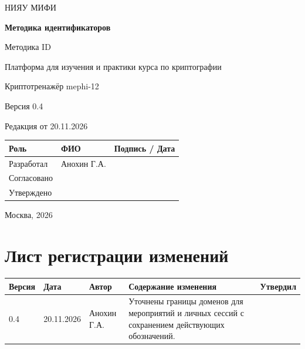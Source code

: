 \documentclass[12pt,a4paper]{article}
\begin{document}
\hypersetup{pageanchor=false}
\begin{titlepage}
  \thispagestyle{empty}
  \centering
  {\large НИЯУ МИФИ\par}
  \vspace*{3.5cm}
  {\LARGE\bfseries Методика идентификаторов\par}
  \vspace{0.5cm}
  {\large Методика ID\par}
  \vspace{0.6cm}
  {\large Платформа для изучения и практики курса по криптографии\par}
  {\large Криптотренажёр mephi-12\par}
  \vspace{0.7cm}
  {\large Версия 0.4\par}
  {\large Редакция от 20.11.2026\par}
  \vspace{1cm}
  \begin{tabularx}{\textwidth}{@{}p{3.4cm}Xp{4cm}@{}}
    \toprule
    Роль & ФИО & Подпись / Дата \\
    \midrule
    Разработал & Анохин Г.А. & \\
    \addlinespace[6pt]
    Согласовано & & \\
    \addlinespace[6pt]
    Утверждено & & \\
    \bottomrule
  \end{tabularx}
  \vfill
  {\large Москва, 2026\par}
\end{titlepage}
\hypersetup{pageanchor=true}

\section*{Лист регистрации изменений}
\begingroup\small\singlespacing
\noindent
\begin{tabularx}{\textwidth}{@{}p{1.2cm}p{2cm}p{2.5cm}Xp{1.8cm}@{}}
\toprule
Версия & Дата & Автор & Содержание изменения & Утвердил \\
\midrule
0.4 & 20.11.2026 & Анохин Г.А. & Уточнены границы доменов для мероприятий и личных сессий с сохранением действующих обозначений. & \\
\bottomrule
\end{tabularx}
\endgroup
\clearpage
\begingroup\small\singlespacing
\tableofcontents
\endgroup
\clearpage

\hypertarget{методика-идентификаторов}{}
\end{document}
